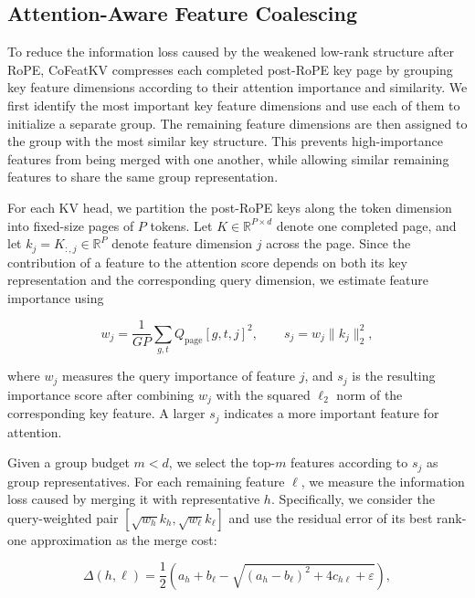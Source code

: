 \documentclass{article} %
\begin{document}
\subsection{Attention-Aware Feature Coalescing}

To reduce the information loss caused by the weakened low-rank structure
after RoPE, CoFeatKV compresses each completed post-RoPE key page by grouping
key feature dimensions according to their attention importance and similarity.
We first identify the most important key feature dimensions and use each of
them to initialize a separate group. The remaining feature dimensions are then
assigned to the group with the most similar key structure. This prevents
high-importance features from being merged with one another, while allowing
similar remaining features to share the same group representation.

For each KV head, we partition the post-RoPE keys along the token dimension
into fixed-size pages of $P$ tokens. Let
$K\in\mathbb{R}^{P\times d}$ denote one completed page, and let
$k_j=K_{:,j}\in\mathbb{R}^{P}$ denote feature dimension $j$ across the page.
Since the contribution of a feature to the attention score depends on both
its key representation and the corresponding query dimension, we estimate
feature importance using

\begin{equation}
    w_j=
    \frac{1}{GP}\sum_{g,t}Q_{\mathrm{page}}[g,t,j]^2,
    \qquad
    s_j=w_j\|k_j\|_2^2,
    \label{eq:importance}
\end{equation}

where $w_j$ measures the query importance of feature $j$, and $s_j$ is the
resulting importance score after combining $w_j$ with the squared $\ell_2$
norm of the corresponding key feature. A larger $s_j$ indicates a more
important feature for attention.

Given a group budget $m<d$, we select the top-$m$ features according to $s_j$
as group representatives. For each remaining feature $\ell$, we measure the
information loss caused by merging it with representative $h$. Specifically,
we consider the query-weighted pair
$\left[\sqrt{w_h}k_h,\sqrt{w_\ell}k_\ell\right]$ and use the residual error of
its best rank-one approximation as the merge cost:

\begin{equation}
\Delta(h,\ell)=
\frac{1}{2}
\left(
a_h+b_\ell-
\sqrt{(a_h-b_\ell)^2+4c_{h\ell}+\varepsilon}
\right),
\end{equation}
\end{document}

